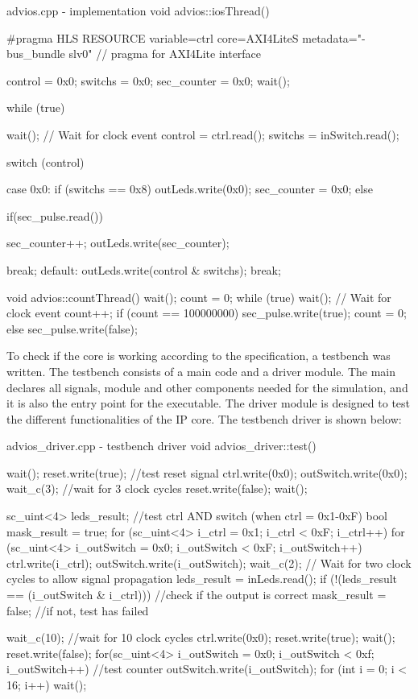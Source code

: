 \documentclass[../main.tex]{subfiles}
\begin{document}
\begin{myminted}{advios.cpp - implementation}
    void advios::iosThread() {
    #pragma HLS RESOURCE variable=ctrl core=AXI4LiteS metadata="-bus_bundle slv0" // pragma for AXI4Lite interface
    
        control = 0x0;
        switchs = 0x0;
        sec_counter = 0x0;
        wait();
    
        while (true) {
            wait(); // Wait for clock event
            control = ctrl.read();
            switchs = inSwitch.read();
    
            switch (control){
                case 0x0:
                    if (switchs == 0x8) {
                        outLeds.write(0x0);
                        sec_counter = 0x0;
                    }else{
                        if(sec_pulse.read()){
        
                            sec_counter++;
                            outLeds.write(sec_counter);
                        }
                    }
                    break;
                default:
                    outLeds.write(control & switchs);
                    break;
            }
        }
    }
    void advios::countThread() {
        wait();
        count = 0;
        while (true) {
            wait();  // Wait for clock event
            count++;
            if (count == 100000000) {
                sec_pulse.write(true);
                count = 0;
            } else {
                sec_pulse.write(false);
            }
        }
    }
\end{myminted}

To check if the core is working according to the specification, a testbench was written. The testbench consists of a main code
and a driver module. 
The main declares all signals, module and other components needed for the simulation, and it is also the entry point for the executable. The driver module is designed to test
the different functionalities of the IP core. The testbench driver is shown below:
\begin{myminted}{advios_driver.cpp - testbench driver}
void advios_driver::test(){
	wait();
	reset.write(true); //test reset signal
	ctrl.write(0x0);
	outSwitch.write(0x0);
	wait_c(3); //wait for 3 clock cycles
	reset.write(false);
	wait();

	sc_uint<4> leds_result; //test ctrl AND switch (when ctrl = 0x1-0xF)
	bool mask_result = true;
	for (sc_uint<4> i_ctrl = 0x1; i_ctrl < 0xF; i_ctrl++) {
	    for (sc_uint<4> i_outSwitch = 0x0; i_outSwitch < 0xF; i_outSwitch++) {
	        ctrl.write(i_ctrl);
	        outSwitch.write(i_outSwitch);
	        wait_c(2);  // Wait for two clock cycles to allow signal propagation
	        leds_result = inLeds.read();
	        if (!(leds_result == (i_outSwitch & i_ctrl))) { //check if the output is correct
	            mask_result = false; //if not, test has failed
	        }
	    }
	}

	wait_c(10); //wait for 10 clock cycles
	ctrl.write(0x0);
	reset.write(true);
	wait();
	reset.write(false);
	for(sc_uint<4> i_outSwitch = 0x0; i_outSwitch < 0xf; i_outSwitch++){ //test counter
		outSwitch.write(i_outSwitch);
		for (int i = 0; i < 16; i++){
			wait();
		}
	}
}
\end{myminted}
\end{document}
